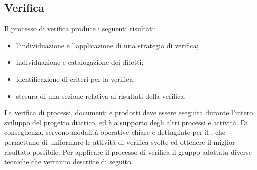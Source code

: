 \documentclass[12pt,a4paper]{article}
\begin{document}
\subsection{Verifica} %
Il processo di verifica produce i seguenti risultati:
\begin{itemize}
  \item l'individuazione e l'applicazione di una strategia di verifica;
  \item individuazione e catalogazione dei difetti;
  \item identificazione di criteri per la verifica;
  \item stesura di una sezione relativa ai risultati della verifica.
\end{itemize}
La verifica di processi, documenti e prodotti deve essere eseguita durante l'intero sviluppo del progetto diattico, ed è a supporto degli altri processi e attività. Di conseguenza, servono modalità operative chiare e dettagliate per il \VR, che permettano di uniformare le attività di verifica svolte ed ottenere il miglior risultato possibile. Per applicare il processo di verifica il gruppo adottata diverse tecniche che verranno descritte di seguito.
\end{document}
